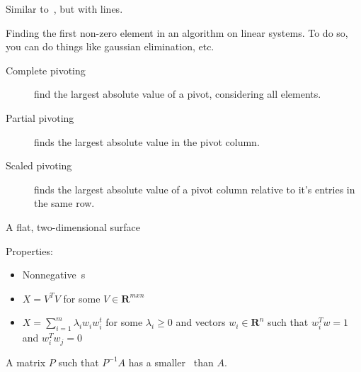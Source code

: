 \begin{definition}[Perpendicular]
    Similar to~, but with lines.
\end{definition}

\begin{definition}[Pivoting]
    Finding the first non-zero element in an algorithm on linear systems.
    To do so, you can do things like gaussian elimination, etc.
    \begin{description}
        \item[Complete pivoting] find the largest absolute value of a pivot,
            considering all elements.
        \item[Partial pivoting] finds the largest absolute value in the pivot
            column.
        \item[Scaled pivoting] finds the largest absolute value of a pivot
            column relative to it's entries in the same row.
    \end{description}
\end{definition}

\begin{definition}[Plane]
    A flat, two-dimensional surface
\end{definition}

\begin{definition}
    Properties:
    \begin{itemize}
        \item Nonnegative~s
        \item $X = V^{T}V$ for some $V \in \mathbf{R}^{mxn}$
        \item $X = \sum\limits_{i=1}^{m}\lambda_{i}w_{i}w^{t}_{i}$ 
            for some $\lambda_{i} \geq 0$ and vectors $w_{i} \in \mathbf{R}^{n}$
            such that $w^{T}_{i}w = 1$ and $w^{T}_{i}w_{j} = 0$

    \end{itemize}
\end{definition}

\begin{definition}[Preconditoner]
    A matrix $P$ such that $P^{-1}A$ has a smaller~
    than $A$.

\end{definition}

